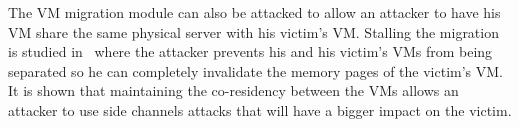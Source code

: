 The VM migration module can also be attacked to allow an attacker to have his VM share the same physical server with his victim's VM. Stalling the migration is studied in~\cite{stalling-atya2017} where the attacker prevents his and his victim's VMs from being separated so he can completely invalidate the memory pages of the victim's VM. It is shown that maintaining the co-residency between the VMs allows an attacker to use side channels attacks that will have a bigger impact on the victim.

\begin{table}[ht]
\end{table}
